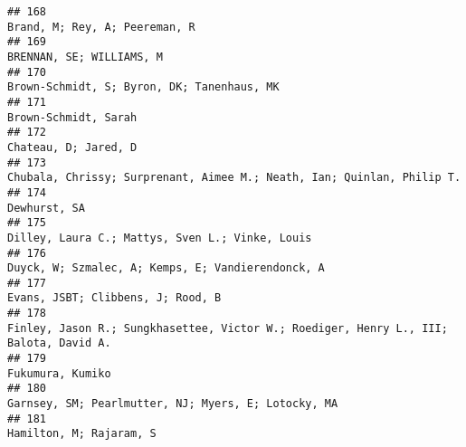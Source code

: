 \documentclass[
  english,
  man]{apa6}
\begin{document}
\begin{verbatim}
## 168                                                                                                                                                            Brand, M; Rey, A; Peereman, R
## 169                                                                                                                                                                 BRENNAN, SE; WILLIAMS, M
## 170                                                                                                                                               Brown-Schmidt, S; Byron, DK; Tanenhaus, MK
## 171                                                                                                                                                                     Brown-Schmidt, Sarah
## 172                                                                                                                                                                     Chateau, D; Jared, D
## 173                                                                                                                   Chubala, Chrissy; Surprenant, Aimee M.; Neath, Ian; Quinlan, Philip T.
## 174                                                                                                                                                                             Dewhurst, SA
## 175                                                                                                                                          Dilley, Laura C.; Mattys, Sven L.; Vinke, Louis
## 176                                                                                                                                        Duyck, W; Szmalec, A; Kemps, E; Vandierendonck, A
## 177                                                                                                                                                        Evans, JSBT; Clibbens, J; Rood, B
## 178                                                                                                    Finley, Jason R.; Sungkhasettee, Victor W.; Roediger, Henry L., III; Balota, David A.
## 179                                                                                                                                                                         Fukumura, Kumiko
## 180                                                                                                                                      Garnsey, SM; Pearlmutter, NJ; Myers, E; Lotocky, MA
## 181                                                                                                                                                                  Hamilton, M; Rajaram, S

\end{verbatim}
\end{document}

